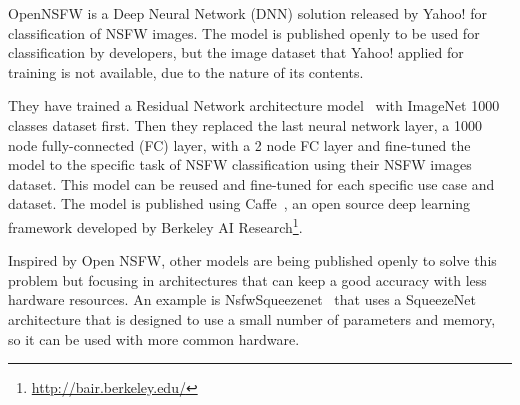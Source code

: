 OpenNSFW is a Deep Neural Network (DNN) solution released by Yahoo! for classification of NSFW images. The model is published openly to be used for classification by developers, but the image dataset that Yahoo! applied for training is not available, due to the nature of its contents.

They have trained a Residual Network architecture model~\cite{He2016} with ImageNet 1000 classes dataset first. Then they replaced the last neural network layer, a 1000 node fully-connected (FC) layer, with a 2 node FC layer and fine-tuned the model to the specific task of NSFW classification using their NSFW images dataset. This model can be reused and fine-tuned for each specific use case and dataset. The model is published using Caffe~\cite{jia2014caffe}, an open source deep learning framework developed by Berkeley AI Research\footnote{\url{http://bair.berkeley.edu/}}.

Inspired by Open NSFW, other models are being published openly to solve this problem but focusing in architectures that can keep a good accuracy with less hardware resources. An example is NsfwSqueezenet~\cite{nsfwsqueezenet} that uses a SqueezeNet~\cite{Iandola2016} architecture that is designed to use a small number of parameters and memory, so it can be used with more common hardware.

